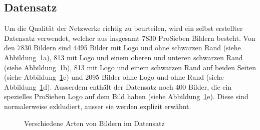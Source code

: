 \documentclass[12pt,a4paper]{report}
\begin{document}
\subsection{Datensatz}\label{subsec:datensatz}
Um die Qualität der Netzwerke richtig zu beurteilen, wird ein selbst erstellter Datensatz verwendet,
welcher aus insgesamt 7830 ProSieben Bildern besteht.
Von den 7830 Bildern sind 4495 Bilder mit Logo und ohne schwarzen Rand (siehe Abbildung~\ref{fig:all_logo}a),
813 mit Logo und einem oberen und unteren schwarzen Rand (siehe Abbildung~\ref{fig:all_logo}b),
813 mit Logo und einem schwarzen Rand auf beiden Seiten (siehe Abbildung~\ref{fig:all_logo}c)
und 2095 Bilder ohne Logo und ohne Rand (siehe Abbildung~\ref{fig:all_logo}d).
Ausserdem enthält der Datensatz noch 400 Bilder, die ein spezielles ProSieben Logo auf dem Bild haben (siehe Abbildung~\ref{fig:all_logo}e).
Diese sind normalerweise exkludiert, ausser sie werden explizit erwähnt.
\begin{figure}[h]%
    \centering
    \qquad
    \qquad
    \qquad
    \qquad
    \caption{Verschiedene Arten von Bildern im Datensatz}%
    \label{fig:all_logo}%
\end{figure}
\end{document}
